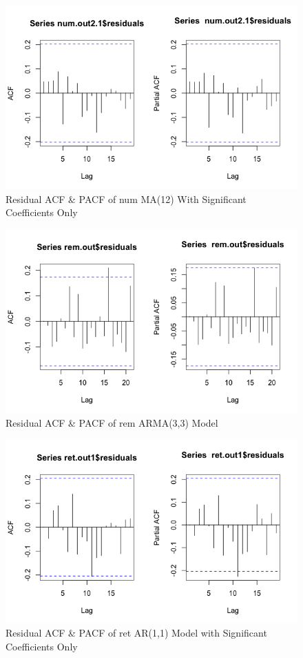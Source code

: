 \documentclass[a4paper]{article}
\begin{document}
\begin{figure}[h!]
\centering
\includegraphics[scale=0.4]{images/res_acf_pacf_num.png}
\caption{Residual ACF \& PACF of num MA(12) With Significant Coefficients Only}
\label{fig:res_acf_pacf_num}
\end{figure}

\begin{figure}[h!]
\centering
\includegraphics[scale=0.4]{images/res_acf_pacf_rem.png}
\caption{Residual ACF \& PACF of rem ARMA(3,3) Model}
\label{fig:res_acf_pacf_rem}
\end{figure}

\begin{figure}[h!]
\centering
\includegraphics[scale=0.4]{images/res_acf_pacf_ret.png}
\caption{Residual ACF \& PACF of ret AR(1,1) Model with Significant Coefficients Only}
\label{fig:res_acf_pacf_ret}
\end{figure}
\end{document}
